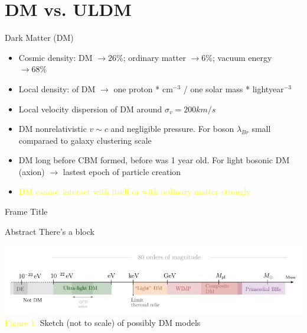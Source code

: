 \section{DM vs. ULDM}

\begin{frame}{Dark Matter (DM)}

\begin{center}
        \textcolor{yellow}{} 
\end{center}


\begin{itemize}
    \item \textcolor{blue2}{ \small Cosmic density:  DM $\rightarrow{26 \%}$; ordinary matter $\rightarrow{6 \%}$; vacuum energy $\rightarrow{68 \%}$  }
    
    \item \textcolor{green2}{\small Local density: of DM $\rightarrow{}$ one proton * cm$^{-3}$ / one solar mass * lightyear$^{-3}$ }
    \item \textcolor{red2}{\small Local velocity dispersion of DM around $\sigma_v = 200 km/s$}
    \item \textcolor{violet2}{\small DM nonrelativistic $v \sim c$ and negligible pressure. For boson $\lambda_{Br}$ small comparaed to galaxy clustering scale }
    \item \textcolor{orange2}{\small DM long before CBM formed, before was 1 year old. For light bosonic DM (axion) $\rightarrow{}$ lastest epoch of particle creation}
    \item \textcolor{yellow}{\small DM cannot interact with itself or with ordinary matter strongly}
\end{itemize}
    
\end{frame}
\begin{frame}{Frame Title}
    
    \begin{block}{Abstract}
    \centering
        There's a block
    \end{block}

        \centering
        \includegraphics[width = 1\textwidth]{images/DM_particles.jpg}\\
        \footnotesize \textcolor{yellow}{Figure 1:} Sketch (not to scale) of possibly DM models
    \end{frame}
    

